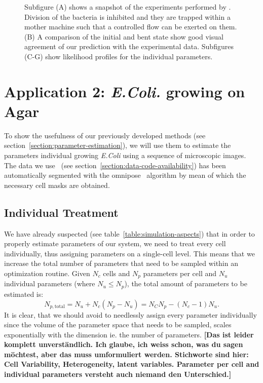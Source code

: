 \documentclass[10pt,letterpaper]{article}
\begin{document}
\begin{figure}
\begin{minipage}{0.62\textwidth}
\begin{tikzonimage}[width=0.33\textwidth]
        \end{tikzonimage}%
    \end{minipage}
    \caption{
        Subfigure (A) shows a snapshot of the experiments performed by \cite{Amir2014_2}.
        Division of the bacteria is inhibited and they are trapped within a mother machine such that
        a controlled flow can be exerted on them.
        (B) A comparison of the initial and bent state show good visual agreement of our prediction
        with the experimental data.
        Subfigures (C-G) show likelihood profiles for the individual parameters.
    }
    \label{fig:amir-bending-simulation}
\end{figure}


\section{Application 2: \textit{E.Coli.} growing on Agar}
\label{section:application-2}
To show the usefulness of our previously developed methods
(see section~\ref{section:parameter-estimation}), we will use them to estimate the parameters
individual growing \textit{E.Coli} using a sequence of microscopic images.
The data we use~\cite{https://doi.org/10.3203/iwf/k-129} (see
section~\ref{section:data-code-availability}) has been automatically segmented with the
omnipose~\cite{Cutler2022} algorithm by mean of which the necessary cell masks are obtained.

\subsection{Individual Treatment}

We have already suspected (see table~\ref{table:simulation-aspects}) that in order to properly
estimate parameters of our system, we need to treat every cell individually, thus assigning
parameters on a single-cell level.
This means that we increase the total number of parameters that need to be sampled within an
optimization routine.
Given $N_c$ cells and $N_p$ parameters per cell and $N_u$ individual parameters (where $N_u\leq N_p$), the total amount of parameters to be estimated is:
\begin{equation}
    N_{p,\text{total}} = N_u + N_c (N_p - N_u) = N_C N_p - (N_c - 1) N_u.
\end{equation}
It is clear, that we should avoid to needlessly assign every parameter individually since the volume
of the parameter space that needs to be sampled, scales exponentially with the dimension ie. the
number of parameters.
\textbf{[Das ist leider komplett unverständlich. Ich glaube, ich weiss schon, was du sagen möchtest, aber das muss umformuliert werden. Stichworte sind hier: Cell Variability, Heterogeneity, latent variables. Parameter per cell and individual parameters versteht auch niemand den Unterschied.]}
\end{document}
